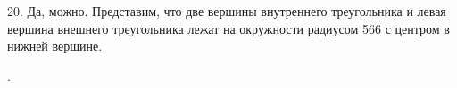 \documentclass[12pt]{article}
\begin{document}
20. Да, можно. Представим, что две вершины внутреннего треугольника и левая вершина внешнего треугольника лежат на окружности радиусом 566 с центром в нижней вершине.
\begin{figure}[ht!]
\end{figure}\newpage{}. \begin{figure}[ht!]
\end{figure}\\
\end{document}
